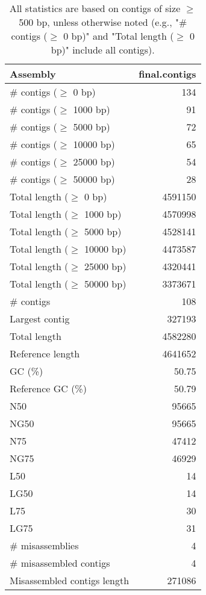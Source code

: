 \documentclass[12pt,a4paper]{article}
\begin{document}
\begin{table}[ht]
\begin{center}
\caption{All statistics are based on contigs of size $\geq$ 500 bp, unless otherwise noted (e.g., "\# contigs ($\geq$ 0 bp)" and "Total length ($\geq$ 0 bp)" include all contigs).}
\begin{tabular}{|l*{1}{|r}|}
\hline
Assembly & final.contigs \\ \hline
\# contigs ($\geq$ 0 bp) & 134 \\ \hline
\# contigs ($\geq$ 1000 bp) & 91 \\ \hline
\# contigs ($\geq$ 5000 bp) & 72 \\ \hline
\# contigs ($\geq$ 10000 bp) & 65 \\ \hline
\# contigs ($\geq$ 25000 bp) & 54 \\ \hline
\# contigs ($\geq$ 50000 bp) & 28 \\ \hline
Total length ($\geq$ 0 bp) & 4591150 \\ \hline
Total length ($\geq$ 1000 bp) & 4570998 \\ \hline
Total length ($\geq$ 5000 bp) & 4528141 \\ \hline
Total length ($\geq$ 10000 bp) & 4473587 \\ \hline
Total length ($\geq$ 25000 bp) & 4320441 \\ \hline
Total length ($\geq$ 50000 bp) & 3373671 \\ \hline
\# contigs & 108 \\ \hline
Largest contig & 327193 \\ \hline
Total length & 4582280 \\ \hline
Reference length & 4641652 \\ \hline
GC (\%) & 50.75 \\ \hline
Reference GC (\%) & 50.79 \\ \hline
N50 & 95665 \\ \hline
NG50 & 95665 \\ \hline
N75 & 47412 \\ \hline
NG75 & 46929 \\ \hline
L50 & 14 \\ \hline
LG50 & 14 \\ \hline
L75 & 30 \\ \hline
LG75 & 31 \\ \hline
\# misassemblies & 4 \\ \hline
\# misassembled contigs & 4 \\ \hline
Misassembled contigs length & 271086 \\ \hline

\end{tabular}
\end{center}
\end{table}
\end{document}
